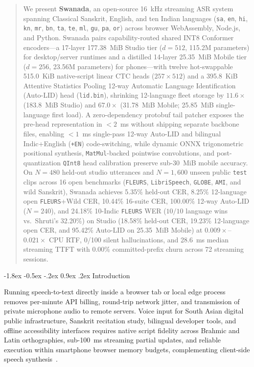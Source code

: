 \documentclass[10pt,twocolumn]{article}
\makeatletter
\renewcommand\section{\@startsection {section}{1}{\z@}%
  {-1.8ex \@plus -0.5ex \@minus -.2ex}%
  {0.9ex \@plus.2ex}%
  {\normalfont\large\bfseries}}
\makeatother
\begin{document}
\begin{abstract}
We present \textbf{Swanada}, an open-source 16~kHz streaming ASR system spanning Classical Sanskrit, English, and ten Indian languages (\texttt{sa}, \texttt{en}, \texttt{hi}, \texttt{kn}, \texttt{mr}, \texttt{bn}, \texttt{ta}, \texttt{te}, \texttt{ml}, \texttt{gu}, \texttt{pa}, \texttt{or}) across browser WebAssembly, Node.js, and Python. Swanada pairs capability-routed shared INT8 Conformer encoders---a 17-layer 177.38~MiB Studio tier ($d = 512$, 115.2M parameters) for desktop/server runtimes and a distilled 14-layer 25.35~MiB Mobile tier ($d = 256$, 23.56M parameters) for phones---with twelve hot-swappable 515.0~KiB native-script linear CTC heads ($257 \times 512$) and a 395.8~KiB Attentive Statistics Pooling 12-way Automatic Language Identification (Auto-LID) head (\texttt{lid.bin}), shrinking 12-language fleet storage by $11.6\times$ (183.8~MiB Studio) and $67.0\times$ (31.78~MiB Mobile; 25.85~MiB single-language first load). A zero-dependency protobuf tail patcher exposes the pre-head representation in $< 2$~ms without shipping separate backbone files, enabling $< 1$~ms single-pass 12-way Auto-LID and bilingual Indic+English (\texttt{+EN}) code-switching, while dynamic ONNX trigonometric positional synthesis, \texttt{MatMul}-backed pointwise convolutions, and post-quantization \texttt{QInt8} head calibration preserve sub-30~MiB mobile accuracy. On $N = 480$ held-out studio utterances and $N = 1{,}600$ unseen public \texttt{test} clips across 16 open benchmarks (\texttt{FLEURS}, \texttt{LibriSpeech}, \texttt{GLOBE}, \texttt{AMI}, and wild Sanskrit), Swanada achieves 5.35\% held-out CER, 8.25\% 12-language open \texttt{FLEURS}+Wild CER, 10.44\% 16-suite CER, 100.00\% 12-way Auto-LID ($N = 240$), and 24.18\% 10-Indic \texttt{FLEURS} WER ($10/10$ language wins vs.\ Shruti's 32.20\%) on Studio (18.58\% held-out CER, 19.23\% 12-language open CER, and 95.42\% Auto-LID on 25.35~MiB Mobile) at $0.009\times$--$0.021\times$ CPU RTF, 0/100 silent hallucinations, and 28.6~ms median streaming TTFT with 0.00\% committed-prefix churn across 72 streaming sessions.
\end{abstract}

\section{Introduction}
\label{sec:intro}

Running speech-to-text directly inside a browser tab or local edge process removes per-minute API billing, round-trip network jitter, and transmission of private microphone audio to remote servers. Voice input for South Asian digital public infrastructure, Sanskrit recitation study, bilingual developer tools, and offline accessibility interfaces requires native script fidelity across Brahmic and Latin orthographies, sub-100~ms streaming partial updates, and reliable execution within smartphone browser memory budgets, complementing client-side speech synthesis~\cite{hemanth2026ninada}.
\end{document}
